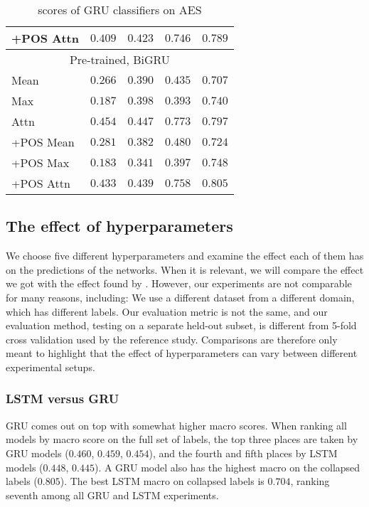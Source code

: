 \begin{table}
\begin{tabular}{lrrrr}
    +POS Attn & $0.409$ & $0.423$ & $0.746$ & $0.789$ \\
    \midrule \multicolumn{5}{c}{Pre-trained, BiGRU} \\ \midrule
    Mean & $0.266$ & $0.390$ & $0.435$ & $0.707$ \\
    Max & $0.187$ & $0.398$ & $0.393$ & $0.740$ \\
    Attn & $0.454$ & $0.447$ & $0.773$ & $0.797$ \\
    +POS Mean & $0.281$ & $0.382$ & $0.480$ & $0.724$ \\
    +POS Max & $0.183$ & $0.341$ & $0.397$ & $0.748$ \\
    +POS Attn & $0.433$ & $0.439$ & $0.758$ & $0.805$ \\
    \bottomrule
  \end{tabular}
  \caption{\FI scores of GRU classifiers on AES}
  \label{tab:gru-results}
\end{table}


\subsection{The effect of hyperparameters}

We choose five different hyperparameters and examine the effect each of them
has on the predictions of the networks. When it is relevant, we will compare
the effect we got with the effect found by \textcite{taghipour16}. However,
our experiments are not comparable for many reasons, including: We use a
different dataset from a different domain, which has different labels. Our
evaluation metric is not the same, and our evaluation method, testing on a
separate held-out subset, is different from 5-fold cross validation used by
the reference study. Comparisons are therefore only meant to highlight that
the effect of hyperparameters can vary between different experimental setups.


\subsubsection{LSTM versus GRU}

GRU comes out on top with somewhat higher macro \FI scores. When ranking all
models by macro \FI score on the full set of labels, the top three places are
taken by GRU models ($0.460$, $0.459$, $0.454$), and the fourth and fifth
places by LSTM models ($0.448$, $0.445$). A GRU model also has the highest
macro \FI on the collapsed labels ($0.805$). The best LSTM macro \FI on
collapsed labels is $0.704$, ranking seventh among all GRU and LSTM
experiments.

